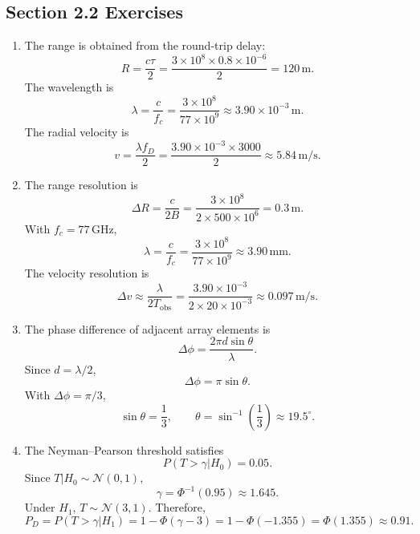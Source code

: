 \subsection*{Section 2.2 Exercises}

\begin{enumerate}[label=\textbf{\arabic*.}, leftmargin=*]

    \item The range is obtained from the round-trip delay:
    \[
        R=\frac{c\tau}{2}
        =
        \frac{3\times10^8\times0.8\times10^{-6}}{2}
        =
        120\,\mathrm{m}.
    \]
    The wavelength is
    \[
        \lambda=\frac{c}{f_c}
        =
        \frac{3\times10^8}{77\times10^9}
        \approx3.90\times10^{-3}\,\mathrm{m}.
    \]
    The radial velocity is
    \[
        v=\frac{\lambda f_D}{2}
        =
        \frac{3.90\times10^{-3}\times3000}{2}
        \approx5.84\,\mathrm{m/s}.
    \]

    \item The range resolution is
    \[
        \Delta R=\frac{c}{2B}
        =
        \frac{3\times10^8}{2\times500\times10^6}
        =
        0.3\,\mathrm{m}.
    \]
    With \(f_c=77\,\mathrm{GHz}\),
    \[
        \lambda=\frac{c}{f_c}
        =
        \frac{3\times10^8}{77\times10^9}
        \approx3.90\,\mathrm{mm}.
    \]
    The velocity resolution is
    \[
        \Delta v\approx\frac{\lambda}{2T_{\mathrm{obs}}}
        =
        \frac{3.90\times10^{-3}}{2\times20\times10^{-3}}
        \approx0.097\,\mathrm{m/s}.
    \]

    \item The phase difference of adjacent array elements is
    \[
        \Delta\phi=\frac{2\pi d\sin\theta}{\lambda}.
    \]
    Since \(d=\lambda/2\),
    \[
        \Delta\phi=\pi\sin\theta.
    \]
    With \(\Delta\phi=\pi/3\),
    \[
        \sin\theta=\frac{1}{3},
        \qquad
        \theta=\sin^{-1}\left(\frac{1}{3}\right)\approx19.5^\circ.
    \]

    \item The Neyman--Pearson threshold satisfies
    \[
        P(T>\gamma|H_0)=0.05.
    \]
    Since \(T|H_0\sim\mathcal{N}(0,1)\),
    \[
        \gamma=\Phi^{-1}(0.95)\approx1.645.
    \]
    Under \(H_1\), \(T\sim\mathcal{N}(3,1)\). Therefore,
    \[
        P_D=P(T>\gamma|H_1)
        =
        1-\Phi(\gamma-3)
        =
        1-\Phi(-1.355)
        =
        \Phi(1.355)
        \approx0.91.
    \]
\end{enumerate}
